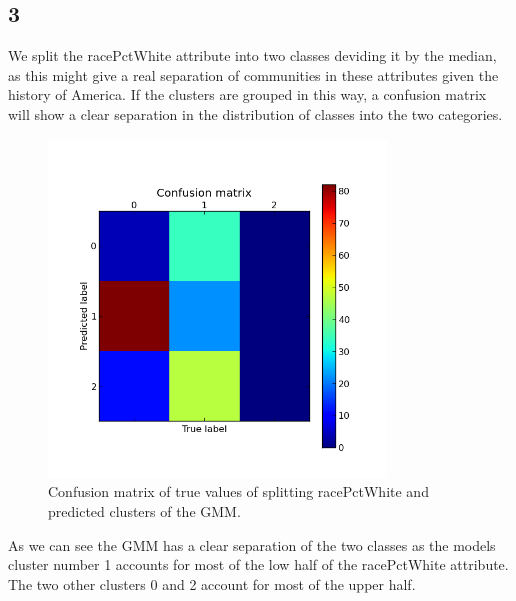\documentclass[a4paper,10pt]{article}
\begin{document}
\subsection{3}
We split the racePctWhite attribute into two classes deviding it by the median, as this might give a real separation of communities in these attributes given the history of America. If the clusters are grouped in this way, a confusion matrix will show a clear separation in the distribution of classes into the two categories.
\begin{figure}[h]
\centering
\includegraphics[h, width=0.8\textwidth]{figure_4}
\caption{Confusion matrix of true values of splitting racePctWhite and predicted clusters of the GMM.}
\end{figure}
As we can see the GMM has a clear separation of the two classes as the models cluster number 1 accounts for most of the low half of the racePctWhite attribute. The two other clusters 0 and 2 account for most of the upper half.
\end{document}
